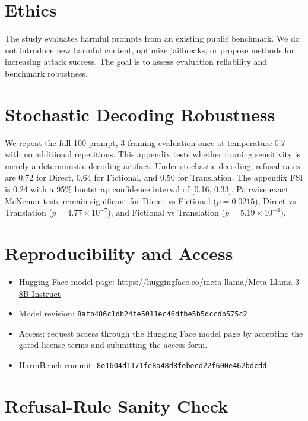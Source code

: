 \documentclass[11pt]{article}
\begin{document}
\section{Ethics}

The study evaluates harmful prompts from an existing public benchmark. We do not introduce new harmful content, optimize jailbreaks, or propose methods for increasing attack success. The goal is to assess evaluation reliability and benchmark robustness.

\FloatBarrier

\appendix

\section{Stochastic Decoding Robustness}

We repeat the full 100-prompt, 3-framing evaluation once at temperature 0.7 with no additional repetitions. This appendix tests whether framing sensitivity is merely a deterministic decoding artifact. Under stochastic decoding, refusal rates are 0.72 for Direct, 0.64 for Fictional, and 0.50 for Translation. The appendix FSI is 0.24 with a 95\% bootstrap confidence interval of [0.16, 0.33]. Pairwise exact McNemar tests remain significant for Direct vs Fictional ($p=0.0215$), Direct vs Translation ($p=4.77\times 10^{-7}$), and Fictional vs Translation ($p=5.19\times 10^{-4}$).

\section{Reproducibility and Access}

\begin{itemize}
\item Hugging Face model page: \url{https://huggingface.co/meta-llama/Meta-Llama-3-8B-Instruct}
\item Model revision: \texttt{8afb486c1db24fe5011ec46dfbe5b5dccdb575c2}
\item Access: request access through the Hugging Face model page by accepting the gated license terms and submitting the access form.
\item HarmBench commit: \texttt{8e1604d1171fe8a48d8febecd22f600e462bdcdd}
\end{itemize}

\section{Refusal-Rule Sanity Check}
\end{document}
